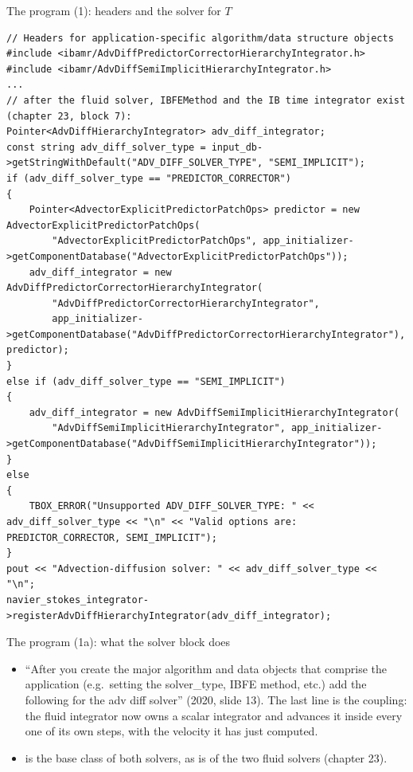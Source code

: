 \documentclass[aspectratio=169,11pt]{beamer}
\begin{document}
\begin{frame}[fragile]{The program (1): headers and the solver for $T$}
\label{fr:code1}
\footnotesize
\begin{lstlisting}[style=cpptiny]
// Headers for application-specific algorithm/data structure objects
#include <ibamr/AdvDiffPredictorCorrectorHierarchyIntegrator.h>
#include <ibamr/AdvDiffSemiImplicitHierarchyIntegrator.h>
...
// after the fluid solver, IBFEMethod and the IB time integrator exist (chapter 23, block 7):
Pointer<AdvDiffHierarchyIntegrator> adv_diff_integrator;
const string adv_diff_solver_type = input_db->getStringWithDefault("ADV_DIFF_SOLVER_TYPE", "SEMI_IMPLICIT");
if (adv_diff_solver_type == "PREDICTOR_CORRECTOR")
{
    Pointer<AdvectorExplicitPredictorPatchOps> predictor = new AdvectorExplicitPredictorPatchOps(
        "AdvectorExplicitPredictorPatchOps", app_initializer->getComponentDatabase("AdvectorExplicitPredictorPatchOps"));
    adv_diff_integrator = new AdvDiffPredictorCorrectorHierarchyIntegrator(
        "AdvDiffPredictorCorrectorHierarchyIntegrator",
        app_initializer->getComponentDatabase("AdvDiffPredictorCorrectorHierarchyIntegrator"), predictor);
}
else if (adv_diff_solver_type == "SEMI_IMPLICIT")
{
    adv_diff_integrator = new AdvDiffSemiImplicitHierarchyIntegrator(
        "AdvDiffSemiImplicitHierarchyIntegrator", app_initializer->getComponentDatabase("AdvDiffSemiImplicitHierarchyIntegrator"));
}
else
{
    TBOX_ERROR("Unsupported ADV_DIFF_SOLVER_TYPE: " << adv_diff_solver_type << "\n" << "Valid options are: PREDICTOR_CORRECTOR, SEMI_IMPLICIT");
}
pout << "Advection-diffusion solver: " << adv_diff_solver_type << "\n";
navier_stokes_integrator->registerAdvDiffHierarchyIntegrator(adv_diff_integrator);
\end{lstlisting}
\end{frame}

\begin{frame}{The program (1a): what the solver block does}
\label{fr:code1a}
\footnotesize
\begin{itemize}
  \item ``After you create the major algorithm and data objects that comprise the application (e.g.\ setting the solver\_type, IBFE method, etc.) add the following for the adv diff solver'' (2020, slide 13). The last line is the coupling: the fluid integrator now owns a scalar integrator and advances it inside every one of its own steps, with the velocity it has just computed.
  \item {} is the base class of both solvers, as  is of the two fluid solvers (chapter 23).
\end{itemize}
\end{frame}
\end{document}
